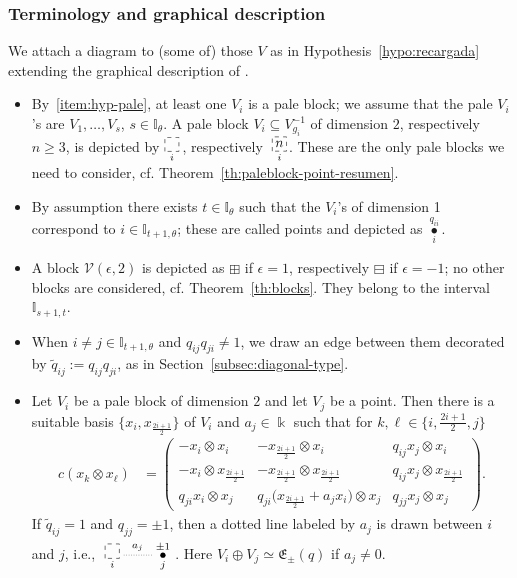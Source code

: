 \documentclass[pdftex]{sigma}
\numberwithin{equation}{section}
\newcommand{\Vc}{{\mathcal{V}}}
\newcommand{\I}{{\mathbb I}}
\newcommand{\eny}{\mathfrak{E}}
\newcommand{\idos}{\frac{2i+1}{2}}
\begin{document}
\subsubsection{Terminology and graphical description}\label{subsubsec:terminology}
We attach a diagram to (some of) those $V$ as in Hypothesis~\ref{hypo:recargada}
extending the graphical description of \cite{AAH-triang}.
\begin{itemize}\itemsep=0pt
\item By~\ref{item:hyp-pale}, at least one $V_i$ is a pale block; we assume that the pale $V_i$'s are
$V_1, \dots, V_{s}$, $s \in \I_{\theta}$.
A pale block $V_i \subseteq V_{g_i}^{-1}$ of dimension $2$, respectively $n\geq 3$, is depicted by
$\underset{i}{\begin{tikzpicture}
\draw[dashed] (0,0) rectangle (0.36,0.36);
\end{tikzpicture}}$\,, respectively~$\underset{i}{\begin{tikzpicture}
\draw[dashed] (0,0) rectangle node[pos=.5] {$n$} (0.36,0.36);
\end{tikzpicture}}$.
These are the only pale blocks we need to consider, cf. Theorem~\ref{th:paleblock-point-resumen}.
\item
By assumption there exists $t \in \I_{\theta}$ such that the $V_i$'s of dimension 1 correspond to $i\in\I_{t+1, \theta}$;
these are called points and depicted as $\overset{q_{ii}} {\underset{i}{\bullet}}$.
\item
A block $\Vc(\epsilon,2)$ is depicted as $\boxplus$ if $\epsilon= 1$, respectively $\boxminus$ if $\epsilon = -1$;
no other blocks are considered, cf. Theorem~\ref{th:blocks}. They belong to the interval $\I_{s+1,t}$.
\item
When $ i\neq j \in \I_{t+1, \theta}$ and $q_{ij}q_{ji} \neq 1$, we draw an edge between
them decorated by $\widetilde{q}_{ij} := q_{ij}q_{ji}$, as in Section~\ref{subsec:diagonal-type}.
\item
Let $V_i$ be a pale block of dimension $2$ and let $V_j$ be a point. Then there
is a suitable basis $\big\{x_i, x_{\idos}\big\}$ of $V_i$ and $a_j\in \Bbbk$ such that
for $k,\ell\in \big\{i,\idos, j \big\}$
\begin{align*}
c(x_k\otimes x_{\ell}) &=
\begin{pmatrix}
- x_i \otimes x_i& - x_{\idos} \otimes x_i& q_{ij} x_j \otimes x_i
\\
- x_i \otimes x_{\idos} & - x_{\idos} \otimes x_{\idos} & q_{ij} x_j \otimes x_{\idos}
\\
q_{ji} x_i \otimes x_j & q_{ji}\big(x_{\idos} + a_jx_i\big) \otimes x_j & q_{jj} x_j \otimes x_j
\end{pmatrix}\!.
\end{align*}
If $\widetilde{q}_{ij}=1$ and $q_{jj} = \pm 1$, then
a dotted line labeled by $a_j$ is drawn between $i$ and $j$, i.e.,
$\xymatrix@C=20pt{ \underset{i}{\begin{tikzpicture}
\draw[dashed] (0,0) rectangle (0.36,0.36);
\end{tikzpicture}} \ar @{.}^{a_j}[r] & \overset{\pm1}{\underset{j}{\bullet}}}$\!.
Here $V_i \oplus V_j \simeq \eny_{\pm}(q)$ if $a_j \neq 0$.


\end{itemize}
\end{document}
